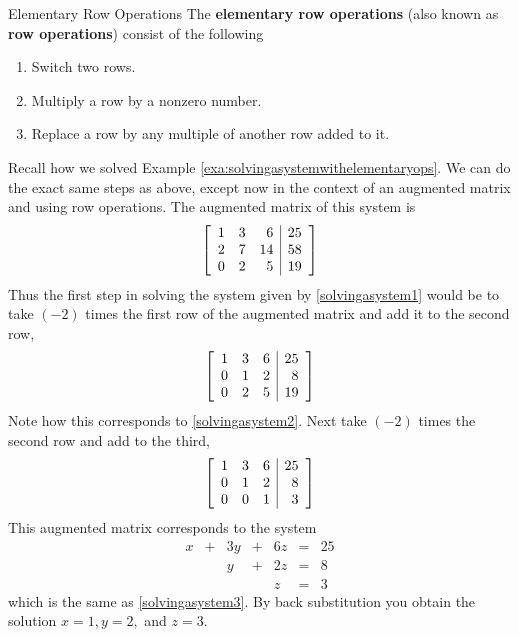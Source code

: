 \begin{definition}{Elementary Row Operations}\label{def:rowoperations}
The \textbf{elementary row operations} (also known as \textbf{row operations}) consist of the following  

\begin{enumerate}
\item Switch two rows.

\item Multiply a row by a nonzero number.

\item Replace a row by any multiple of another row added to it.
\end{enumerate}
\end{definition}

Recall how we solved Example \ref{exa:solvingasystemwithelementaryops}. 
We can do the exact same steps as above, except now in the context of an augmented matrix and using row operations. 
The augmented matrix of this system is 
\begin{equation*}
\left[ 
\begin{array}{rrr|r}
1 & 3 & 6 &  25 \\
2 & 7 & 14 &  58 \\
0 & 2 & 5 &  19
\end{array}
\right] 
\end{equation*}
Thus the first step in
solving the system given by \ref{solvingasystem1} would be to take $\left( -2\right) $ times the first row
of the augmented matrix and add it to the second row,
\begin{equation*}
\left[
\begin{array}{rrr|r}
1 & 3 & 6 & 25 \\
0 & 1 & 2 & 8 \\
0 & 2 & 5 & 19
\end{array}
\right] 
\end{equation*}
Note how this corresponds to \ref{solvingasystem2}. Next take $\left( -2\right) $
times the second row and add to the third,
\begin{equation*}
\left[ 
\begin{array}{rrr|r}
1 & 3 & 6 & 25 \\
0 & 1 & 2 & 8 \\
0 & 0 & 1 & 3
\end{array}
\right]
\end{equation*}
This augmented matrix corresponds to the system
\begin{equation*}
\begin{array}{ccccccc}
x&+&3y&+&6z&=&25 \\
&&y&+&2z&=&8 \\
&&&&z&=&3
\end{array}
\end{equation*}
which is the same as \ref{solvingasystem3}. By back substitution you obtain the solution
$x=1,y=2,$ and $z=3.$

